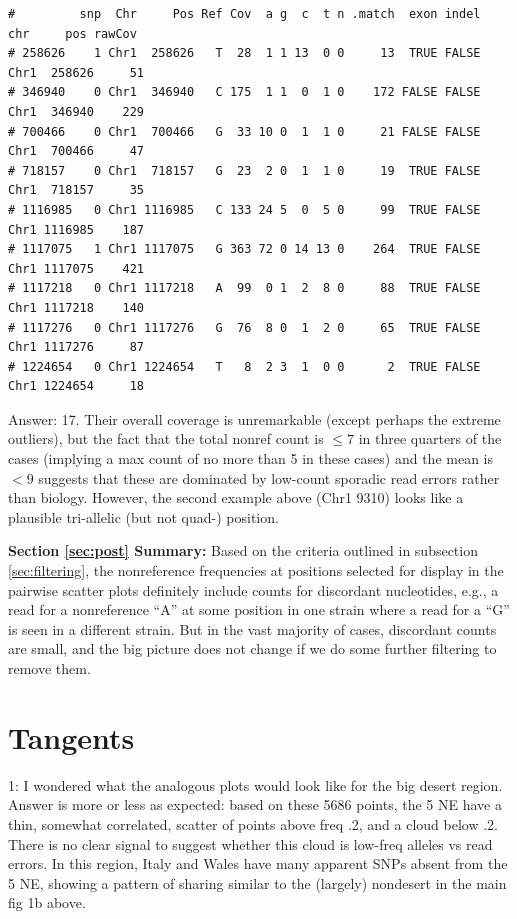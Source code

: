 \documentclass{article}\usepackage[]{graphicx}\usepackage[]{color}
\makeatletter
\newenvironment{kframe}{%
 \def\at@end@of@kframe{}%
 \ifinner\ifhmode%
  \def\at@end@of@kframe{\end{minipage}}%
  \begin{minipage}{\columnwidth}%
 \fi\fi%
 \def\FrameCommand##1{\hskip\@totalleftmargin \hskip-\fboxsep
 \colorbox{shadecolor}{##1}\hskip-\fboxsep
     \hskip-\linewidth \hskip-\@totalleftmargin \hskip\columnwidth}%
 \MakeFramed {\advance\hsize-\width
   \@totalleftmargin\z@ \linewidth\hsize
   \@setminipage}}%
 {\par\unskip\endMakeFramed%
 \at@end@of@kframe}
\newenvironment{knitrout}{}{} %
\makeatother
\begin{document}
\begin{knitrout}
\begin{kframe}
\begin{verbatim}
#         snp  Chr     Pos Ref Cov  a g  c  t n .match  exon indel  chr     pos rawCov
# 258626    1 Chr1  258626   T  28  1 1 13  0 0     13  TRUE FALSE Chr1  258626     51
# 346940    0 Chr1  346940   C 175  1 1  0  1 0    172 FALSE FALSE Chr1  346940    229
# 700466    0 Chr1  700466   G  33 10 0  1  1 0     21 FALSE FALSE Chr1  700466     47
# 718157    0 Chr1  718157   G  23  2 0  1  1 0     19  TRUE FALSE Chr1  718157     35
# 1116985   0 Chr1 1116985   C 133 24 5  0  5 0     99  TRUE FALSE Chr1 1116985    187
# 1117075   1 Chr1 1117075   G 363 72 0 14 13 0    264  TRUE FALSE Chr1 1117075    421
# 1117218   0 Chr1 1117218   A  99  0 1  2  8 0     88  TRUE FALSE Chr1 1117218    140
# 1117276   0 Chr1 1117276   G  76  8 0  1  2 0     65  TRUE FALSE Chr1 1117276     87
# 1224654   0 Chr1 1224654   T   8  2 3  1  0 0      2  TRUE FALSE Chr1 1224654     18
\end{verbatim}
\end{kframe}
\end{knitrout}

Answer: 17.  Their overall coverage is unremarkable (except perhaps the extreme outliers), but the fact that the total nonref count is $\leq 7$ in three quarters of the cases (implying a max count of no more than 5 in these cases) and the mean is $<9$ suggests that these are dominated by low-count sporadic read errors rather than biology.  However, the second example above (Chr1  9310) looks like a plausible tri-allelic (but not quad-) position.

\textbf{Section \ref{sec:post} Summary:} Based on the criteria outlined in subsection \ref{sec:filtering}, the nonreference frequencies at positions selected for display in the pairwise scatter plots definitely include counts for discordant nucleotides, e.g., a read for a nonreference ``A'' at some position in one strain where a read for a ``G'' is seen in a different strain.  But in the vast majority of cases,  discordant counts are small, and the big picture does not change if we do some further filtering to remove them.

\section{Tangents}
1: I wondered what the analogous plots would look like for the big desert region.  Answer is more or less as expected: based on these 5686  points, the 5 NE have a thin, somewhat correlated, scatter of points above freq .2, and a cloud below .2.  There is no clear signal to suggest whether this cloud is low-freq alleles vs  read errors.  In this region, Italy and Wales have many apparent SNPs absent from the 5 NE, showing a pattern of sharing similar to the (largely) nondesert in the main fig 1b above.
\end{document}
